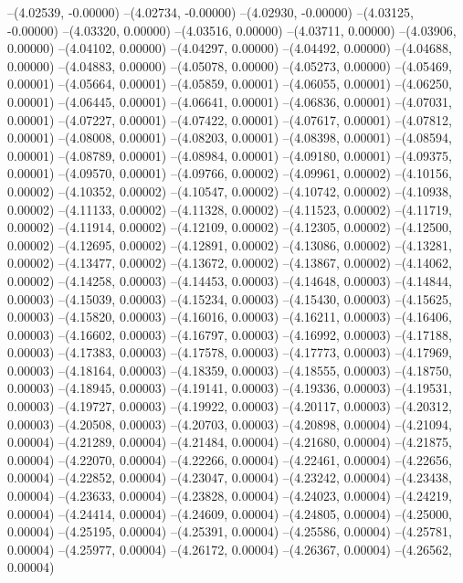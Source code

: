 --(4.02539, -0.00000)
--(4.02734, -0.00000)
--(4.02930, -0.00000)
--(4.03125, -0.00000)
--(4.03320, 0.00000)
--(4.03516, 0.00000)
--(4.03711, 0.00000)
--(4.03906, 0.00000)
--(4.04102, 0.00000)
--(4.04297, 0.00000)
--(4.04492, 0.00000)
--(4.04688, 0.00000)
--(4.04883, 0.00000)
--(4.05078, 0.00000)
--(4.05273, 0.00000)
--(4.05469, 0.00001)
--(4.05664, 0.00001)
--(4.05859, 0.00001)
--(4.06055, 0.00001)
--(4.06250, 0.00001)
--(4.06445, 0.00001)
--(4.06641, 0.00001)
--(4.06836, 0.00001)
--(4.07031, 0.00001)
--(4.07227, 0.00001)
--(4.07422, 0.00001)
--(4.07617, 0.00001)
--(4.07812, 0.00001)
--(4.08008, 0.00001)
--(4.08203, 0.00001)
--(4.08398, 0.00001)
--(4.08594, 0.00001)
--(4.08789, 0.00001)
--(4.08984, 0.00001)
--(4.09180, 0.00001)
--(4.09375, 0.00001)
--(4.09570, 0.00001)
--(4.09766, 0.00002)
--(4.09961, 0.00002)
--(4.10156, 0.00002)
--(4.10352, 0.00002)
--(4.10547, 0.00002)
--(4.10742, 0.00002)
--(4.10938, 0.00002)
--(4.11133, 0.00002)
--(4.11328, 0.00002)
--(4.11523, 0.00002)
--(4.11719, 0.00002)
--(4.11914, 0.00002)
--(4.12109, 0.00002)
--(4.12305, 0.00002)
--(4.12500, 0.00002)
--(4.12695, 0.00002)
--(4.12891, 0.00002)
--(4.13086, 0.00002)
--(4.13281, 0.00002)
--(4.13477, 0.00002)
--(4.13672, 0.00002)
--(4.13867, 0.00002)
--(4.14062, 0.00002)
--(4.14258, 0.00003)
--(4.14453, 0.00003)
--(4.14648, 0.00003)
--(4.14844, 0.00003)
--(4.15039, 0.00003)
--(4.15234, 0.00003)
--(4.15430, 0.00003)
--(4.15625, 0.00003)
--(4.15820, 0.00003)
--(4.16016, 0.00003)
--(4.16211, 0.00003)
--(4.16406, 0.00003)
--(4.16602, 0.00003)
--(4.16797, 0.00003)
--(4.16992, 0.00003)
--(4.17188, 0.00003)
--(4.17383, 0.00003)
--(4.17578, 0.00003)
--(4.17773, 0.00003)
--(4.17969, 0.00003)
--(4.18164, 0.00003)
--(4.18359, 0.00003)
--(4.18555, 0.00003)
--(4.18750, 0.00003)
--(4.18945, 0.00003)
--(4.19141, 0.00003)
--(4.19336, 0.00003)
--(4.19531, 0.00003)
--(4.19727, 0.00003)
--(4.19922, 0.00003)
--(4.20117, 0.00003)
--(4.20312, 0.00003)
--(4.20508, 0.00003)
--(4.20703, 0.00003)
--(4.20898, 0.00004)
--(4.21094, 0.00004)
--(4.21289, 0.00004)
--(4.21484, 0.00004)
--(4.21680, 0.00004)
--(4.21875, 0.00004)
--(4.22070, 0.00004)
--(4.22266, 0.00004)
--(4.22461, 0.00004)
--(4.22656, 0.00004)
--(4.22852, 0.00004)
--(4.23047, 0.00004)
--(4.23242, 0.00004)
--(4.23438, 0.00004)
--(4.23633, 0.00004)
--(4.23828, 0.00004)
--(4.24023, 0.00004)
--(4.24219, 0.00004)
--(4.24414, 0.00004)
--(4.24609, 0.00004)
--(4.24805, 0.00004)
--(4.25000, 0.00004)
--(4.25195, 0.00004)
--(4.25391, 0.00004)
--(4.25586, 0.00004)
--(4.25781, 0.00004)
--(4.25977, 0.00004)
--(4.26172, 0.00004)
--(4.26367, 0.00004)
--(4.26562, 0.00004)
